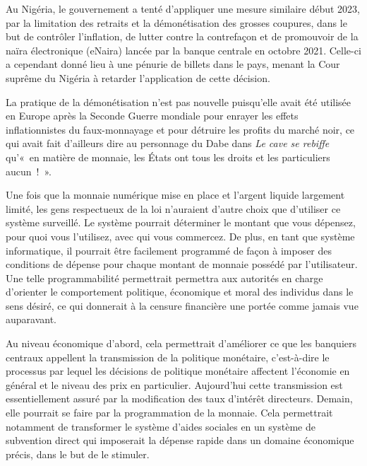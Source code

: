 Au Nigéria, le gouvernement a tenté d'appliquer une mesure similaire début 2023, par la limitation des retraits et la démonétisation des grosses coupures, dans le but de contrôler l'inflation, de lutter contre la contrefaçon et de promouvoir de la naïra électronique (eNaira) lancée par la banque centrale en octobre 2021. Celle-ci a cependant donné lieu à une pénurie de billets dans le pays, menant la Cour suprême du Nigéria à retarder l'application de cette décision.

La pratique de la démonétisation n'est pas nouvelle puisqu'elle avait été utilisée en Europe après la Seconde Guerre mondiale pour enrayer les effets inflationnistes du faux-monnayage et pour détruire les profits du marché noir, ce qui avait fait d'ailleurs dire au personnage du Dabe dans \emph{Le cave se rebiffe} qu'«~en matière de monnaie, les États ont tous les droits et les particuliers aucun~!~».

Une fois que la monnaie numérique mise en place et l'argent liquide largement limité, les gens respectueux de la loi n'auraient d'autre choix que d'utiliser ce système surveillé. Le système pourrait déterminer le montant que vous dépensez, pour quoi vous l'utilisez, avec qui vous commercez. De plus, en tant que système informatique, il pourrait être facilement programmé de façon à imposer des conditions de dépense pour chaque montant de monnaie possédé par l'utilisateur. Une telle programmabilité permettrait permettra aux autorités en charge d'orienter le comportement politique, économique et moral des individus dans le sens désiré, ce qui donnerait à la censure financière une portée comme jamais vue auparavant.

Au niveau économique d'abord, cela permettrait d'améliorer ce que les banquiers centraux appellent la transmission de la politique monétaire, c'est-à-dire le processus par lequel les décisions de politique monétaire affectent l'économie en général et le niveau des prix en particulier. Aujourd'hui cette transmission est essentiellement assuré par la modification des taux d'intérêt directeurs. Demain, elle pourrait se faire par la programmation de la monnaie. Cela permettrait notamment de transformer le système d'aides sociales en un système de subvention direct qui imposerait la dépense rapide dans un domaine économique précis, dans le but de le stimuler.

